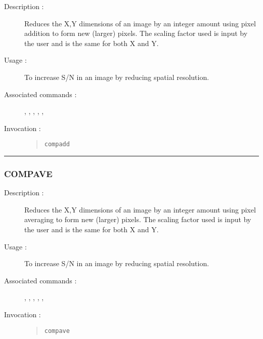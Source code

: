 \begin{description}

\item[Description :] Reduces the X,Y dimensions of an image by an
integer amount using pixel addition to form new (larger) pixels.  The
scaling factor used is input by the user and is the same for both X and
Y.

\item[Usage :] To increase S/N in an image by reducing spatial resolution.

\item[Associated commands :] {\tt {}}, 
{\tt {}}, {\tt {}}, 
{\tt {}}, {\tt {}}, 
{\tt {}}

\item[Invocation :]

\begin{quote}{\tt  compadd }\end{quote}

\end{description}

\hrule 
\subsubsection*{\label{COMPAVE}COMPAVE}

\begin{description}

\item[Description :] Reduces the X,Y dimensions of an image by an
integer amount using pixel averaging to form new (larger) pixels.  The
scaling factor used is input by the user and is the same for both X and
Y.

\item[Usage :] To increase S/N in an image by reducing spatial resolution.

\item[Associated commands :] {\tt {}}, 
{\tt {}}, {\tt {}}, 
{\tt {}}, {\tt {}}, 
{\tt {}}

\item[Invocation :]

\begin{quote}{\tt  compave }\end{quote}

\end{description}

